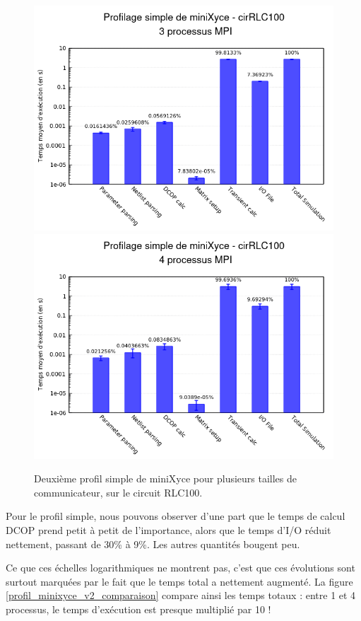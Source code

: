 \documentclass[11pt,a4paper,oneside]{memoir}
\theoremstyle{definition}
\theoremstyle{remark}
\theoremstyle{plain}
\begin{document}
\begin{figure}
\begin{center}
\includegraphics[scale=0.45]{Images-Rapport/Profil_miniXyce_v2/Profil_miniXyce_v2_3proc.png}
\includegraphics[scale=0.45]{Images-Rapport/Profil_miniXyce_v2/Profil_miniXyce_v2_4proc.png}
\caption{Deuxième profil simple de miniXyce pour plusieurs tailles de communicateur, sur le circuit RLC100.}
\label{profil_minixyce_v2}
\end{center}
\end{figure}

Pour le profil simple, nous pouvons observer d'une part que le temps de calcul DCOP prend petit à petit de l'importance, alors que le temps d'I/O réduit nettement, passant de 30\% à 9\%. Les autres quantités bougent peu.

Ce que ces échelles logarithmiques ne montrent pas, c'est que ces évolutions sont surtout marquées par le fait que le temps total a nettement augmenté. La figure \ref{profil_minixyce_v2_comparaison} compare ainsi les temps totaux : entre 1 et 4 processus, le temps d'exécution est presque multiplié par 10 !
\end{document}
